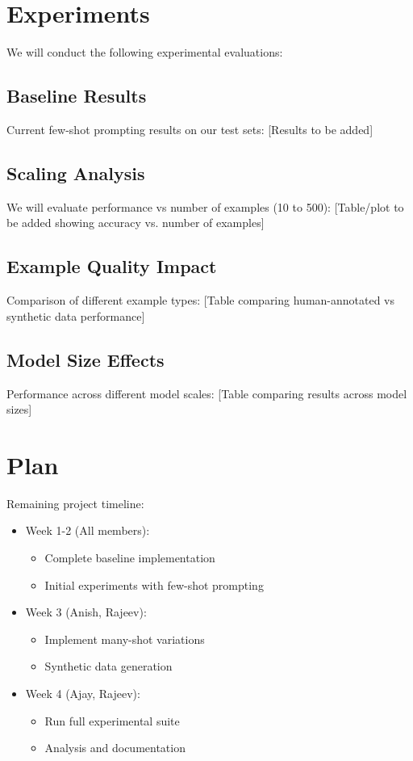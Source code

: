 \documentclass{article}
\begin{document}
\section{Experiments}
We will conduct the following experimental evaluations:

\subsection{Baseline Results}
Current few-shot prompting results on our test sets:
[Results to be added]

\subsection{Scaling Analysis}
We will evaluate performance vs number of examples (10 to 500):
[Table/plot to be added showing accuracy vs. number of examples]

\subsection{Example Quality Impact}
Comparison of different example types:
[Table comparing human-annotated vs synthetic data performance]

\subsection{Model Size Effects}
Performance across different model scales:
[Table comparing results across model sizes]

\section{Plan}
Remaining project timeline:

\begin{itemize}
    \item Week 1-2 (All members):
        \begin{itemize}
            \item Complete baseline implementation
            \item Initial experiments with few-shot prompting
        \end{itemize}
    \item Week 3 (Anish, Rajeev):
        \begin{itemize}
            \item Implement many-shot variations
            \item Synthetic data generation
        \end{itemize}
    \item Week 4 (Ajay, Rajeev):
        \begin{itemize}
            \item Run full experimental suite
            \item Analysis and documentation
        \end{itemize}
\end{itemize}



\end{document}
